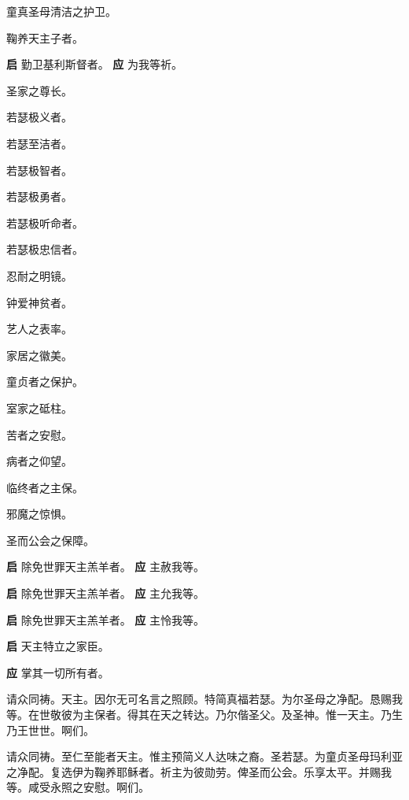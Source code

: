 \documentclass[UTF8,17pt]{ctexart}
\begin{document}
 童真圣母清洁之护卫。

 鞠养天主⼦者。

\textbf{启} \quad 勤卫基利斯督者。 \hfill \textbf{应} \quad 为我等祈。

 圣家之尊长。

 若瑟极义者。

 若瑟⾄洁者。

 若瑟极智者。

 若瑟极勇者。

 若瑟极听命者。

 若瑟极忠信者。

 忍耐之明镜。

 钟爱神贫者。

 艺⼈之表率。

 家居之徽美。

 童贞者之保护。

 室家之砥柱。

 苦者之安慰。

 病者之仰望。

 临终者之主保。

 邪魔之惊惧。

 圣⽽公会之保障。

\textbf{启} \quad 除免世罪天主羔⽺者。 \hfill \textbf{应} \quad 主赦我等。

\textbf{启} \quad 除免世罪天主羔⽺者。 \hfill \textbf{应} \quad 主允我等。

\textbf{启} \quad 除免世罪天主羔⽺者。 \hfill \textbf{应} \quad 主怜我等。

\textbf{启} \quad 天主特⽴之家⾂。

\textbf{应} \quad 掌其⼀切所有者。

请众同祷。天主。因尔⽆可名⾔之照顾。特简真福若瑟。为尔圣母之净配。恳赐我等。在世敬彼为主保者。得其在天之转达。乃尔偕圣⽗。及圣神。惟⼀天主。乃⽣乃王世世。啊们。

请众同祷。⾄仁⾄能者天主。惟主预简义⼈达味之裔。圣若瑟。为童贞圣母玛利亚之净配。复选伊为鞠养耶稣者。祈主为彼勋劳。俾圣⽽公会。乐享太平。并赐我等。咸受永照之安慰。啊们。
\end{document}
